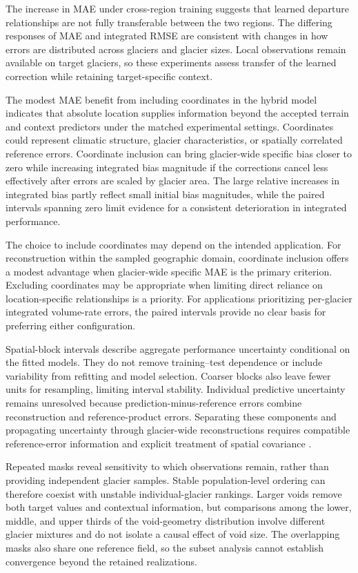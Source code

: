\documentclass[tc,manuscript]{copernicus}
\begin{document}
The increase in MAE under cross-region training suggests that learned departure relationships are not fully transferable between the two regions. The differing responses of MAE and integrated RMSE are consistent with changes in how errors are distributed across glaciers and glacier sizes. Local observations remain available on target glaciers, so these experiments assess transfer of the learned correction while retaining target-specific context.

The modest MAE benefit from including coordinates in the hybrid model indicates that absolute location supplies information beyond the accepted terrain and context predictors under the matched experimental settings. Coordinates could represent climatic structure, glacier characteristics, or spatially correlated reference errors. Coordinate inclusion can bring glacier-wide specific bias closer to zero while increasing integrated bias magnitude if the corrections cancel less effectively after errors are scaled by glacier area. The large relative increases in integrated bias partly reflect small initial bias magnitudes, while the paired intervals spanning zero limit evidence for a consistent deterioration in integrated performance.

The choice to include coordinates may depend on the intended application. For reconstruction within the sampled geographic domain, coordinate inclusion offers a modest advantage when glacier-wide specific MAE is the primary criterion. Excluding coordinates may be appropriate when limiting direct reliance on location-specific relationships is a priority. For applications prioritizing per-glacier integrated volume-rate errors, the paired intervals provide no clear basis for preferring either configuration.

Spatial-block intervals describe aggregate performance uncertainty conditional on the fitted models. They do not remove training–test dependence or include variability from refitting and model selection. Coarser blocks also leave fewer units for resampling, limiting interval stability. Individual predictive uncertainty remains unresolved because prediction-minus-reference errors combine reconstruction and reference-product errors. Separating these components and propagating uncertainty through glacier-wide reconstructions requires compatible reference-error information and explicit treatment of spatial covariance  \citep{hugonnet2022}.

Repeated masks reveal sensitivity to which observations remain, rather than providing independent glacier samples. Stable population-level ordering can therefore coexist with unstable individual-glacier rankings. Larger voids remove both target values and contextual information, but comparisons among the lower, middle, and upper thirds of the void-geometry distribution involve different glacier mixtures and do not isolate a causal effect of void size. The overlapping masks also share one reference field, so the subset analysis cannot establish convergence beyond the retained realizations.
\end{document}
